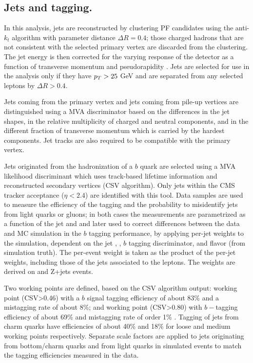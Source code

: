 \subsection{Jets and \bjet tagging.}

In this analysis, jets are reconstructed by clustering PF candidates using the anti-$k_t$ algorithm with parameter distance $\Delta R=0.4$; those charged hadrons that are not consistent with the selected primary vertex are discarded from the clustering. The jet energy is then corrected for the varying response of the detector as a function of transverse momentum \pt and pseudorapidity \etac. Jets are selected for use in the analysis only if they have $p_T > 25$ GeV and are separated from any selected leptons by $\Delta R > 0.4$.

Jets coming from the primary vertex and jets coming from pile-up vertices are distinguished using a MVA discriminator based on the differences in the jet shapes, in the relative multiplicity of charged and neutral components, and in the different fraction of transverse momentum which is carried by the hardest components. Jet tracks are also required to be compatible with the primary
vertex.

Jets originated from the hadronization of a $b$ quark are selected using a MVA likelihood discriminant which uses track-based lifetime information and reconstructed secondary vertices (CSV algorithm). Only jets within the CMS tracker acceptance ($\eta < 2.4$) are identified with this tool. Data samples are used to measure the efficiency of the \bjet tagging and the probability to misidentify jets from light quarks or gluons; in both cases the measurements are parametrized as a function of the jet \pt and \etac and later used to correct differences between the data and MC simulation in the $b$ tagging performance, by applying per-jet weights to the simulation, dependent on the jet \pt, \etac, $b$ tagging discriminator, and flavor (from simulation truth)\cite{btag_corr}. The per-event weight is taken as the product of the per-jet weights, including those of the jets associated to the leptons. The weights are derived on \ttbar and Z+jets events.

Two working points are defined, based on the CSV algorithm output:  working point (CSV>0.46) with a $b$ signal tagging efficiency of about 83\% and a mistagging rate of about 8\%; and  working point (CSV>0.80) with $b-$tagging efficiency of about 69\% and mistagging rate of order 1\% \cite{btag_points}. Tagging of jets from charm quarks have efficiencies of about 40\%  and 18\% for loose and medium working points respectively. Separate scale factors are applied to jets originating from bottom/charm quarks and from light quarks in simulated events to match the tagging efficiencies measured in the data.


